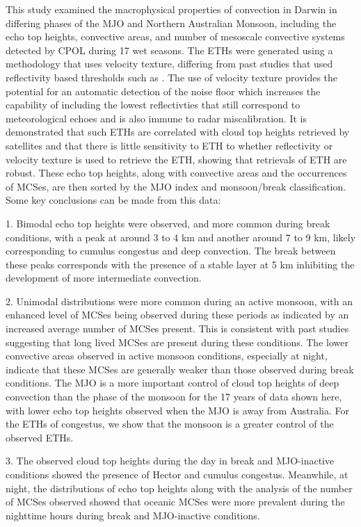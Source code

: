 \documentclass[journal abbreviation, manuscript]{copernicus}
\begin{document}
    This study examined the macrophysical properties of convection in Darwin in differing phases of the MJO and Northern Australian Monsoon, including the echo top heights, convective areas, and number of mesoscale convective systems detected by CPOL during 17 wet seasons. The ETHs were generated using a methodology that uses velocity texture, differing from past studies that used reflectivity based thresholds such as \cite{MayandBallinger2006, Kumaretal2013, Kumaretal2013b}. The use of velocity texture provides the potential for an automatic detection of the noise floor which increases the capability of including the lowest reflectivties that still correspond to meteorological echoes and is also immune to radar miscalibration. It is demonstrated that such ETHs are correlated with cloud top heights retrieved by satellites \citep{Ohkawara2004, Minnisetal2011} and that there is little sensitivity to ETH to whether reflectivity or velocity texture is used to retrieve the ETH, showing that retrievals of ETH are robust. These echo top heights, along with convective areas and the occurrences of MCSes, are then sorted by the \cite{WheelerHendon2004} MJO index and \cite{Dros1996} monsoon/break classification. Some key conclusions can be made from this data:
    
    1. Bimodal echo top heights were observed, and more common during break conditions, with a peak at around 3 to 4 km and another around 7 to 9 km, likely corresponding to cumulus congestus and deep convection. The break between these peaks corresponds with the presence of a stable layer at 5 km inhibiting the development of more intermediate convection. 
    
    2. Unimodal distributions were more common during an active monsoon, with an enhanced level of MCSes being observed during these periods as indicated by an increased average number of MCSes present. This is consistent with past studies suggesting that long lived MCSes are present during these conditions. The lower convective areas observed in active monsoon conditions, especially at night, indicate that these MCSes are generally weaker than those observed during break conditions. The MJO is a more important control of cloud top heights of deep convection than the phase of the monsoon for the 17 years of data shown here, with lower echo top heights observed when the MJO is away from Australia. For the ETHs of congestus, we show that the monsoon is a greater control of the observed ETHs.
        
    3. The observed cloud top heights during the day in break and MJO-inactive conditions showed the presence of Hector and cumulus congestus. Meanwhile, at night, the distributions of echo top heights along with the analysis of the number of MCSes observed showed that oceanic MCSes were more prevalent during the nighttime hours during break and MJO-inactive conditions.
    
\end{document}
